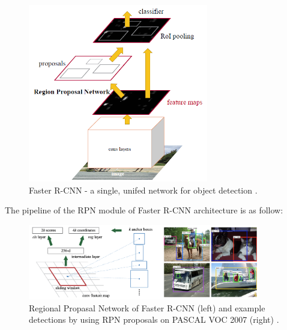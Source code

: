 \begin{figure}[thb]
    \centering
    \includegraphics[width=0.7\textwidth]{endoscopy_resources/frcnn_arch.png}
    \caption{Faster R-CNN - a single, unifed network for object detection \cite{FasterRCNN}.}
    \label{fig:frcnn_arch}
\end{figure}

The pipeline of the RPN module of Faster R-CNN architecture is as follow:
\begin{figure}[thb]
    \centering
    \includegraphics[width=0.9\textwidth]{endoscopy_resources/frcnn_rpn.png}
    \caption{Regional Propasal Network of Faster R-CNN (left) and example detections by using RPN proposals on PASCAL VOC 2007 (right) \cite{FasterRCNN}.}
    \label{fig:frcnn_rpn}
\end{figure}

